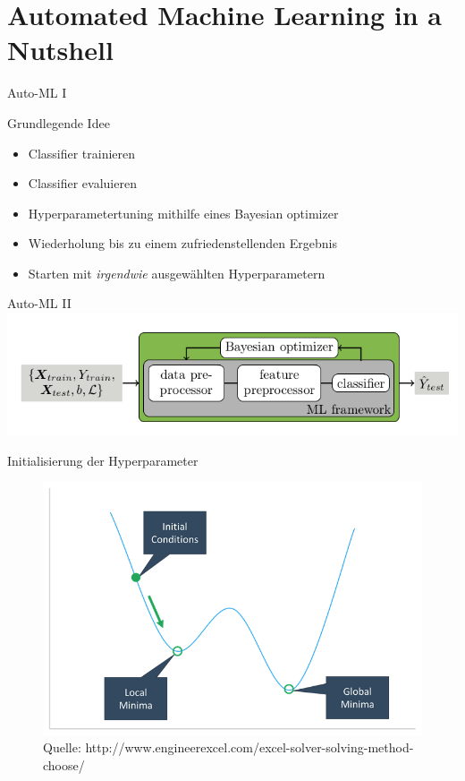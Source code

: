\documentclass{beamer}
\begin{document}
	
	\section{Automated Machine Learning in a Nutshell}%
	
	
	\begin{frame}{Auto-ML I}
		\begin{alertblock}{Grundlegende Idee}
			\begin{itemize}
				\item Classifier trainieren
				\item Classifier evaluieren
				\item Hyperparametertuning mithilfe eines Bayesian optimizer
				\item Wiederholung bis zu einem zufriedenstellenden Ergebnis
				\item Starten mit \emph{irgendwie} ausgewählten Hyperparametern
			\end{itemize}
		\end{alertblock}
	\end{frame}
	
	\begin{frame}{Auto-ML II}
		\includegraphics[width=\linewidth]{Bilder/MachineLeaningInANutshell}
	\end{frame}
	
	\begin{frame}{Initialisierung der Hyperparameter}
		
		\begin{figure}[ht]
			\centering
			\includegraphics[width=0.85\linewidth]{Bilder/InitialConditions.png}
			\caption{Quelle: http://www.engineerexcel.com/excel-solver-solving-method-choose/}
		\end{figure}
	\end{frame}
	
\end{document}
